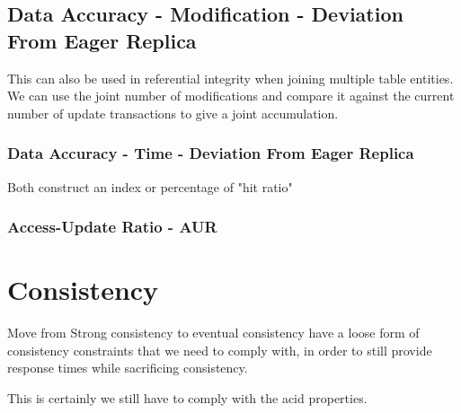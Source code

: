 \subsection{Data Accuracy - Modification - Deviation From Eager Replica}
This can also be used in referential integrity when joining multiple table entities.
We can use the joint number of modifications and compare it against the current number of update transactions to give a joint accumulation.


\subsubsection{Data Accuracy - Time -  Deviation From Eager Replica}

Both construct an index or percentage of "hit ratio"

\subsubsection{Access-Update Ratio - AUR}




\section{Consistency}
Move from Strong consistency to eventual consistency 
have a loose form of consistency constraints that we need to comply with, in order to still provide response times while sacrificing consistency.



This is certainly we still have to comply with the acid properties. 